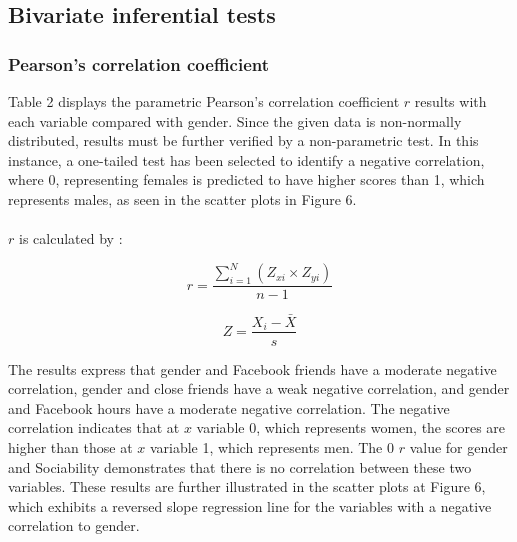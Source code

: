 \subsection{Bivariate inferential tests}

\subsubsection{Pearson's correlation coefficient}

Table 2 displays the parametric Pearson's correlation coefficient $r$ results with each variable compared with gender. Since the given data is non-normally distributed, results must be further verified by a non-parametric test. In this instance, a one-tailed test has been selected to identify a negative correlation, where 0, representing females is predicted to have higher scores than 1, which represents males, as seen in the scatter plots in Figure 6. \\
\\
$r$ is calculated by \citep{McKillup2011}:

$$r = \frac{\sum_{i=1}^N (Z_{xi} \times Z_{yi})}{n - 1}$$

$$Z = \frac{X_i - \bar{X}}{s}$$


The results express that gender and Facebook friends have a moderate negative correlation, gender and close friends have a weak negative correlation, and gender and Facebook hours have a moderate negative correlation. The negative correlation indicates that at $x$ variable 0, which represents women, the scores are higher than those at $x$ variable 1, which represents men. The 0 $r$ value for gender and Sociability demonstrates that there is no correlation between these two variables. These results are further illustrated in the scatter plots at Figure 6, which exhibits a reversed slope regression line for the variables with a negative correlation to gender.


